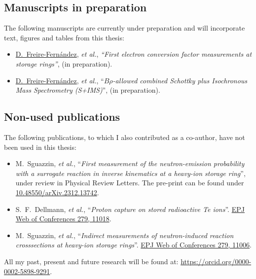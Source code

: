 \subsection*{Manuscripts in preparation}
The following manuscripts are currently under preparation and will incorporate text, figures and tables from this thesis:
\begin{itemize}
  \item \underline{D.~Freire-Fernández}, \textit{et al.}, {\it ``First electron conversion factor measurements at storage rings''}, (in preparation). 
  \item \underline{D.~Freire-Fernández}, \textit{et al.}, ``{\it $B\rho$-allowed combined Schottky plus Isochronous Mass Spectrometry (\textsc{S+IMS})}'', (in preparation).
\end{itemize}
\subsection*{Non-used publications}
The following publications, to which I also contributed as a co-author, have not been used in this thesis:
\begin{itemize}
  \item M.~Sguazzin, \textit{et al.}, ``{\it First measurement of the neutron-emission probability with a surrogate reaction in inverse kinematics at a heavy-ion storage ring}'', under review in Physical Review Letters. The pre-print can be found under \href{https://doi.org/10.48550/arXiv.2312.13742}{10.48550/arXiv.2312.13742}.
  \item S.~F.~Dellmann, \textit{et al.}, ``{\it Proton capture on stored radioactive Te ions}''. \href{https://doi.org/10.1051/epjconf/202327911018}{EPJ Web of Conferences 279, 11018}.
  \item M.~Sguazzin, \textit{et al.}, ``{\it Indirect measurements of neutron-induced reaction crosssections at heavy-ion storage rings}''. \href{https://doi.org/10.1051/epjconf/202327911006}{EPJ Web of Conferences 279, 11006}.
\end{itemize}

All my past, present and future research will be found at:  \href{https://orcid.org/0000-0002-5898-9291}{https://orcid.org/0000-0002-5898-9291}.